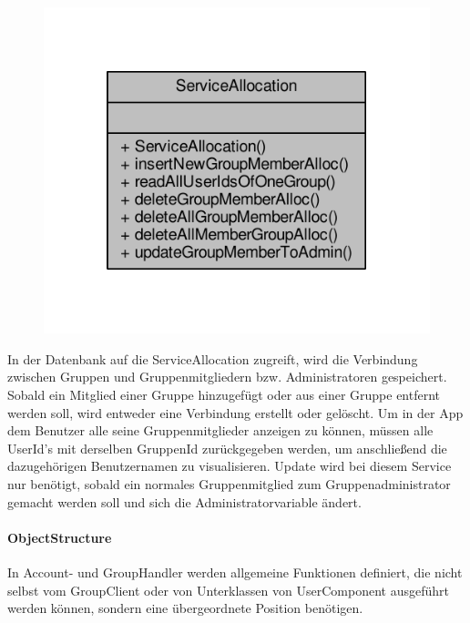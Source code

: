 \begin{figure}[H]
	\includegraphics[scale = 1]{res/umlClasses/service_allocation__coll__graph.pdf} 
	\centering
\end{figure}
In der Datenbank auf die ServiceAllocation zugreift, wird die Verbindung zwischen Gruppen und Gruppenmitgliedern bzw. Administratoren gespeichert. 
Sobald ein Mitglied einer Gruppe hinzugefügt oder aus einer Gruppe entfernt werden soll, wird entweder eine Verbindung erstellt oder gelöscht. 
Um in der App dem Benutzer alle seine Gruppenmitglieder anzeigen zu können, müssen alle UserId's mit derselben GruppenId zurückgegeben werden, um anschließend die dazugehörigen Benutzernamen zu visualisieren.
Update wird bei diesem Service nur benötigt, sobald ein normales Gruppenmitglied zum Gruppenadministrator gemacht werden soll und sich die Administratorvariable ändert.
	

\paragraph{ObjectStructure}

In Account- und GroupHandler werden allgemeine Funktionen definiert, die nicht selbst vom GroupClient oder von Unterklassen von UserComponent ausgeführt werden können, sondern eine übergeordnete Position benötigen.

